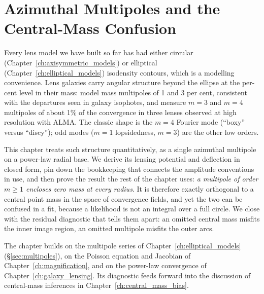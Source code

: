 
\chapter{Azimuthal Multipoles and the Central-Mass Confusion}
\label{ch:multipoles}

\noindent
Every lens model we have built so far has had either circular
(Chapter~\ref{ch:axisymmetric_models}) or elliptical
(Chapter~\ref{ch:elliptical_models}) isodensity contours, which is a
modelling convenience.  Lens galaxies carry angular structure beyond
the ellipse at the per-cent level in their mass:
\citet{oriordan_vegetti_2024} model mass multipoles of 1 and 3 per
cent, consistent with the departures seen in galaxy isophotes, and
\citet{stacey_2024} measure $m=3$ and $m=4$ multipoles of about 1\% of
the convergence in three lenses observed at high resolution with ALMA.
The classic shape is the $m=4$ Fourier mode (``boxy'' versus
``discy''); odd modes ($m=1$ lopsidedness, $m=3$) are the other
low orders.

This chapter treats such structure quantitatively, as a single
azimuthal multipole on a power-law radial base.  We derive its lensing
potential and deflection in closed form, pin down the bookkeeping that
connects the amplitude conventions in use, and then prove the result
the rest of the chapter uses: \emph{a multipole of
order $m\ge1$ encloses zero mass at every radius}.  It is therefore
exactly orthogonal to a central point mass in the space of convergence
fields, and yet the two can be confused in a fit, because a
likelihood is not an integral over a full circle.  We close with the
residual diagnostic that tells them apart: an omitted central mass
misfits the inner image region, an omitted multipole misfits the
outer arcs.

The chapter builds on the multipole series of
Chapter~\ref{ch:elliptical_models} (\S\ref{sec:multipoles}), on the
Poisson equation and Jacobian of Chapter~\ref{ch:magnification}, and on
the power-law convergence of Chapter~\ref{ch:galaxy_lensing}.  Its
diagnostic feeds forward into the discussion of central-mass
inferences in Chapter~\ref{ch:central_mass_bias}.

